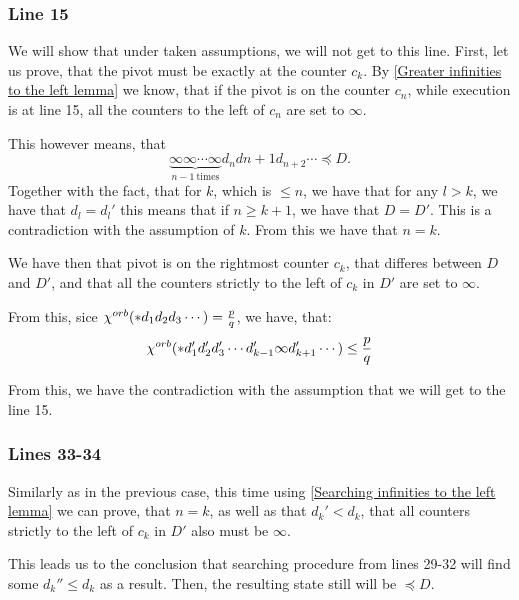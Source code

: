 \subsubsection{Line 15}
We will show that under taken assumptions, we will not get to this line. 
First, let us prove, that the pivot must be exactly at the counter $c_k$. 
By \ref{Greater infinities to the left lemma} we know, that if the pivot is 
on the counter $c_n$, while execution is at line 15, 
all the counters to the left of $c_n$ are set to $\infty$. 

This however means, that
\begin{equation}
\underbrace{\infty\infty\cdots\infty}_{n-1\ \mathrm{times}}d_nd{n+1}d_{n+2}\cdots \preceq D.
\end{equation}
Together with the fact, that for $k$, which is $\leq n$, we have that 
for any $l > k$, we have that $d_l = d_l'$ this means that if $n \geq k+1$, we have that 
$D = D'$. This is a contradiction with the assumption of $k$. 
From this we have that $n = k$.

We have then that pivot is on the rightmost counter $c_k$, 
that differes between $D$ and $D'$, and 
that all the counters strictly to the left of $c_k$ in $D'$ are set to $\infty$. 


From this, sice ${\chi^{orb}(*d_1d_2d_3\cdots)} = \frac{p}{q}$, we have, that: 
\begin{equation}
{\chi^{orb}(*d_1'd_2'd_3'\cdots d_{k-1}'\infty d_{k+1}'\cdots)} \leq \frac{p}{q} 
\end{equation}

From this, we have the contradiction with the assumption that we will get to the line 15. 

\subsubsection{Lines 33-34}
Similarly as in the previous case, this time using \ref{Searching infinities to the left lemma} 
we can prove, that $n=k$, as well as that $d_k' < d_k$, that all 
counters strictly to the left of $c_k$ in $D'$ also must be $\infty$.

This leads us to the conclusion that searching procedure from lines 
29-32 will find some $ d_k'' \leq d_k$ as a result. Then, the resulting state 
still will be $\preceq D$. 


